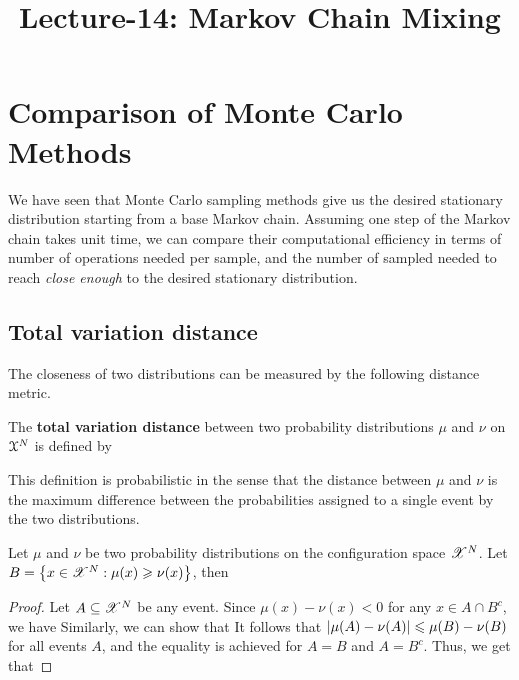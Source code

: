 \documentclass[letterpaper,english,10pt]{article}
\title{Lecture-14: Markov Chain Mixing}
\begin{document}
\maketitle

\section{Comparison of Monte Carlo Methods}
We have seen that Monte Carlo sampling methods give us the desired stationary distribution starting from a base Markov chain. 
Assuming one step of the Markov chain takes unit time, 
we can compare their computational efficiency in terms of number of operations needed per sample,  
and the number of sampled needed to reach \textit{close enough} to the desired stationary distribution. 

\subsection{Total variation distance}
The closeness of two distributions can be measured by the following distance metric.
\begin{defn}
The \textbf{total variation distance} between two probability distributions $\mu$ and $\nu$ on $\mathcal{X}^N$ is defined by
\end{defn}
This definition is probabilistic in the sense that the distance between $\mu$ and $\nu$ is the maximum difference between the probabilities assigned to a single event by the two distributions. 
\begin{prop}
Let $\mu$ and $\nu$ be two probability distributions on the configuration space $\mathscr{X}^N$. 
Let $B = \left\{x \in \mathscr{X}^N: \mu(x) \geqslant \nu(x)\right\}$, then 
\end{prop}
\begin{proof}
Let $A \subseteq \mathscr{X}^N$ be any event. 
Since $\mu(x)  - \nu(x) < 0$ for any $x \in A\cap B^c$, we have 
Similarly, we can show that 
It follows that $\left\lvert\mu(A)-\nu(A)\right\rvert \leqslant  \mu(B) - \nu(B)$ for all events $A$, 
and the equality is achieved for $A = B$ and $A = B^c$. 
Thus, we get that 
\end{proof}
\end{document}

